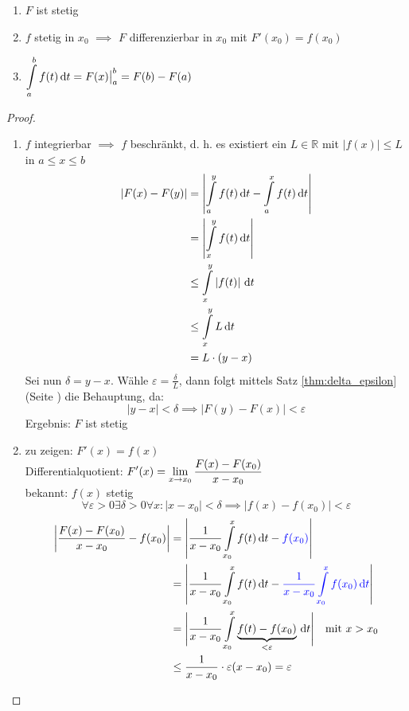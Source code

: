 \begin{theorem}
  \begin{enumerate}
    \item $F$ ist stetig
    \item $f$ stetig in $x_0$ $\implies$ $F$ differenzierbar in $x_0$ mit $F'(x_0) = f(x_0)$
    \item $\displaystyle \int\limits_a^b f(t)\,\mathrm d t = F(x)\big|_a^b = F(b) - F(a)$
  \end{enumerate}
\end{theorem}

\begin{proof}
  \begin{enumerate}
    \item $f$ integrierbar $\implies$ $f$ beschränkt, d. h. es existiert ein $L \in \mathbb R$ mit $\left|f(x)\right| \leq L$ in $a\leq x \leq b$
      \begin{align*}
        \left| F(x) - F(y) \right| &= \left| \int\limits_a^y f(t)\,\mathrm d t - \int\limits_a^x f(t)\,\mathrm d t \right|\\
        &= \left| \int\limits_x^y f(t)\,\mathrm d t \right |\\
        &\leq \int\limits_x^y \left| f(t) \right| \,\mathrm d t\\
        &\leq \int\limits_x^y L\,\mathrm d t\\
        &= L\cdot (y-x)
      \end{align*}
      Sei nun $\delta = y-x$. Wähle $\varepsilon = \frac \delta L$, dann folgt mittels Satz \ref{thm:delta_epsilon} (Seite \pageref{thm:delta_epsilon}) die Behauptung, da:
      \[ \left| y - x \right| < \delta \implies \left| F(y) - F(x) \right| < \varepsilon \]
      Ergebnis: $F$ ist stetig
    \item zu zeigen: $F'(x) = f(x)$\\
      Differentialquotient: $\displaystyle F'(x)= \lim_{x \to x_0}\frac{F(x)-F(x_0)}{x-x_0}$\\
      bekannt: $f(x)$ stetig
      \[ \forall \varepsilon > 0 \exists \delta > 0 \forall x: \left| x - x_0 \right| < \delta \implies \left| f(x) - f(x_0) \right| < \varepsilon \]
      \begin{align*}
        \left| \frac{F(x)-F(x_0)}{x-x_0} - f(x_0) \right|
        &= \left| \frac{1}{x-x_0} \int\limits_{x_0}^x f(t)\,\mathrm d t - \textcolor{blue}{f(x_0)} \right|\\
        &= \left| \frac{1}{x-x_0} \int\limits_{x_0}^x f(t)\,\mathrm d t - \textcolor{blue}{\frac 1 {x-x_0} \int\limits_{x_0}^x f(x_0)\,\mathrm d t} \right| \\
        &= \Biggl| \frac{1}{x-x_0} \int\limits_{x_0}^x \underbrace{f(t) - f(x_0)}_{< \varepsilon} \,\mathrm d t \Biggr| \quad\text{mit }x>x_0\\
        &\leq \frac{1}{x-x_0} \cdot \varepsilon (x-x_0) = \varepsilon
      \end{align*}
  \end{enumerate}
\end{proof}

